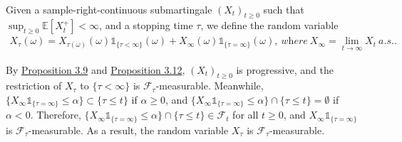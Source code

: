 \documentclass{article}
\numberwithin{equation}{section}
\newcommand{\E}{\mathbb{E}}
\theoremstyle{plain}
\theoremstyle{definition}
\begin{document}
\paragraph{}  Given a sample-right-continuous submartingale $(X_t)_{t\geq 0}$ such that $\sup_{t\geq 0}\E[X_t^+]<\infty$, and a stopping time $\tau$, we define the random variable
\begin{align*}
	X_\tau(\omega)=X_{\tau(\omega)}(\omega)\mathds{1}_{\{\tau <\infty\}}(\omega) + X_\infty(\omega)\mathds{1}_{\{\tau=\infty\}}(\omega),\ \textit{where}\ X_\infty=\lim_{t\to\infty} X_t\ a.s..
\end{align*}

By \hyperref[prop:3.9]{Proposition 3.9} and \hyperref[prop:3.12]{Proposition 3.12}, $(X_t)_{t\geq 0}$ is progressive, and the restriction of $X_\tau$ to $\{\tau<\infty\}$ is $\mathscr{F}_\tau$-measurable. Meanwhile, $\{X_\infty\mathds{1}_{\{\tau=\infty\}}\leq\alpha\}\subset\{\tau\leq t\}$ if $\alpha\geq 0$, and $\{X_\infty\mathds{1}_{\{\tau=\infty\}}\leq\alpha\}\cap\{\tau\leq t\}=\emptyset$ if $\alpha<0$. Therefore, $\{X_\infty\mathds{1}_{\{\tau=\infty\}}\leq\alpha\}\cap\{\tau\leq t\}\in\mathscr{F}_t$ for all $t\geq 0$, and $X_\infty\mathds{1}_{\{\tau=\infty\}}$ is $\mathscr{F}_\tau$-measurable. As a result, the random variable $X_\tau$ is $\mathscr{F}_\tau$-measurable.
\end{document}
